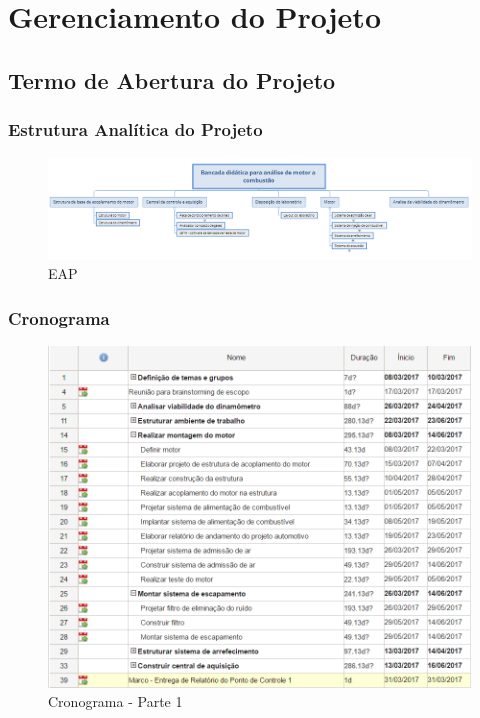 \chapter[Gerenciamento do Projeto]{Gerenciamento do Projeto}

\section{Termo de Abertura do Projeto}



\subsection{Estrutura Analítica do Projeto}

\begin{landscape}
	\begin{figure}
		\centering
		\includegraphics[keepaspectratio=true,scale= 0.8]{figuras/EAP.PNG}
		\caption{EAP}
		\label{eap}
	\end{figure}
\end{landscape}

\subsection{Cronograma}

\begin{figure}[h!]
	\centering
	\includegraphics[keepaspectratio=true,scale= 0.8]{figuras/cronograma-PI2-parte1.PNG}
	\caption{Cronograma - Parte 1}
	\label{eap}
\end{figure}

